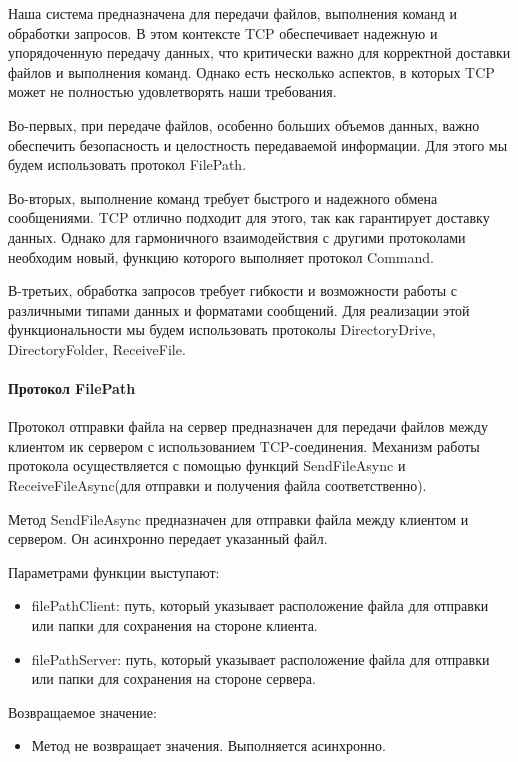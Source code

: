 Наша система предназначена для передачи файлов, выполнения команд и обработки запросов. В этом контексте TCP обеспечивает надежную и упорядоченную передачу данных, что критически важно для корректной доставки файлов и выполнения команд. Однако есть несколько аспектов, в которых TCP может не полностью удовлетворять наши требования.

Во-первых, при передаче файлов, особенно больших объемов данных, важно обеспечить безопасность и целостность передаваемой информации. Для этого мы будем использовать протокол FilePath.

Во-вторых, выполнение команд требует быстрого и надежного обмена сообщениями. TCP отлично подходит для этого, так как гарантирует доставку данных. Однако для гармоничного взаимодействия с другими протоколами необходим новый, функцию которого выполняет протокол Command.

В-третьих, обработка запросов требует гибкости и возможности работы с различными типами данных и форматами сообщений. Для реализации этой функциональности мы будем использовать протоколы DirectoryDrive, DirectoryFolder, ReceiveFile.

\paragraph{Протокол FilePath}
Протокол отправки файла на сервер предназначен для передачи файлов между клиентом ик сервером с использованием TCP-соединения. Механизм работы протокола осуществляется с помощью функций SendFileAsync и ReceiveFileAsync(для отправки и получения файла соответственно).

Метод SendFileAsync предназначен для отправки файла между клиентом и сервером. Он асинхронно передает указанный файл.

Параметрами функции выступают:
\begin{itemize}
	\item filePathClient: путь, который указывает расположение файла для отправки или папки для сохранения на стороне клиента.
	\item filePathServer: путь, который указывает расположение файла для отправки или папки для сохранения на стороне сервера.
\end{itemize}

Возвращаемое значение:
\begin{itemize}
	\item Метод не возвращает значения. Выполняется асинхронно.
\end{itemize}

